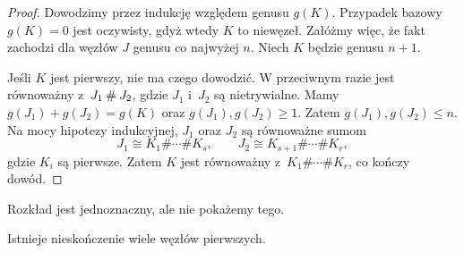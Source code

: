 \begin{proof}
    Dowodzimy przez indukcję względem genusu $g(K)$.
    Przypadek bazowy $g(K) = 0$ jest oczywisty, gdyż wtedy $K$ to niewęzeł.
    Załóżmy więc, że fakt zachodzi dla węzłów $J$ genusu co najwyżej $n$.
    Niech $K$ będzie genusu $n + 1$.

    Jeśli $K$ jest pierwszy, nie ma czego dowodzić.
    W przeciwnym razie jest równoważny z~$J_1 \mathbin{\#} J_2$, gdzie $J_1$ i~$J_2$ są nietrywialne.
    Mamy $g(J_1)+g(J_2)=g(K)$ oraz $g(J_1),g(J_2)\geqslant 1$.
    Zatem $g(J_1),g(J_2)\leqslant n$.
    Na mocy hipotezy indukcyjnej, $J_1$ oraz $J_2$ są równoważne sumom
    \[
        J_1 \cong K_1\#\cdots\# K_s,\qquad
        J_2 \cong K_{s+1}\#\cdots\# K_r,
    \]
    gdzie $K_i$ są pierwsze.
    Zatem $K$ jest równoważny z~$K_1\#\cdots\# K_r$, co kończy dowód.
\end{proof}

Rozkład jest jednoznaczny, ale nie pokażemy tego.

\begin{proposition}
\label{infty_primes}
    Istnieje nieskończenie wiele węzłów pierwszych.
\end{proposition}

